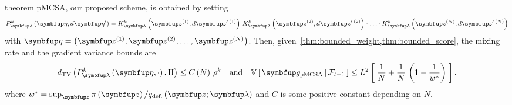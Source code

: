 
\begin{theoremEnd}{theorem}\label{thm:pmcsa}
  pMCSA, our proposed scheme, is obtained by setting
  {%
  \begin{align*}
    P_{\vlambda}^k\left(\veta, d\veta^{\prime}\right)
    = 
    K_{\vlambda}^k\left(\vz^{(1)}, d\vz^{\prime\; (1)}\right)
    \,
    K_{\vlambda}^k\left(\vz^{(2)}, d\vz^{\prime\; (2)}\right)
    \cdot
    \ldots 
    \cdot
    K_{\vlambda}^k\left(\vz^{(N)}, d\vz^{\prime\; (N)}\right)
  \end{align*}
  }
  with \(\veta = \left(\vz^{(1)}, \vz^{(2)}, \ldots, \vz^{(N)}\right)\).
  Then, given~\cref{thm:bounded_weight,thm:bounded_score}, the mixing rate and the gradient variance bounds are
  {%
  \begin{align*}
    \DTV{P_{\vlambda}^k\left(\veta, \cdot\right)}{\Pi}
    \leq
    C\left(N\right)\,{\rho^k}
    \quad\text{and}\quad
    \V{ \vg_{\mathrm{pMCSA}} \,\middle|\, \mathcal{F}_{t-1} }
    \leq
    L^2 \left[\; \frac{1}{N} + \frac{1}{N}\,\left(1 - \frac{1}{w^*}\right) \;\right],
  \end{align*}
  }
  where \(w^* = \sup_{\vz} \pi\left(\vz\right) / q_{\text{def.}}\left(\vz;\vlambda\right)\) and \(C\) is some positive constant depending on \(N\).
\end{theoremEnd}

